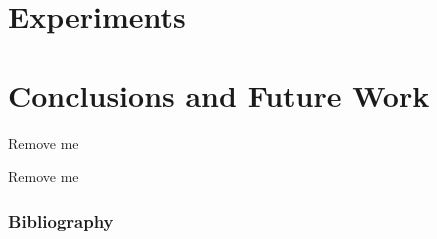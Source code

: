 \documentclass[xcolor=pdftex,dvipsnames,table]{beamer}
\begin{document}
\section{Experiments}

\section{Conclusions and Future Work}

\begin{frame}{Remove me}
  \begin{block}{Remove me}
    \cite{core}
  \end{block}
\end{frame}

\begin{frame}[allowframebreaks]
  \frametitle{Bibliography}
  
  
\end{frame}
\end{document}

